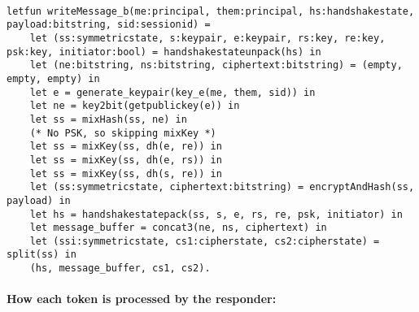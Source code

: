 \begin{lstlisting}

letfun writeMessage_b(me:principal, them:principal, hs:handshakestate, payload:bitstring, sid:sessionid) =
	let (ss:symmetricstate, s:keypair, e:keypair, rs:key, re:key, psk:key, initiator:bool) = handshakestateunpack(hs) in
	let (ne:bitstring, ns:bitstring, ciphertext:bitstring) = (empty, empty, empty) in
	let e = generate_keypair(key_e(me, them, sid)) in
	let ne = key2bit(getpublickey(e)) in
	let ss = mixHash(ss, ne) in
	(* No PSK, so skipping mixKey *)
	let ss = mixKey(ss, dh(e, re)) in
	let ss = mixKey(ss, dh(e, rs)) in
	let ss = mixKey(ss, dh(s, re)) in
	let (ss:symmetricstate, ciphertext:bitstring) = encryptAndHash(ss, payload) in
	let hs = handshakestatepack(ss, s, e, rs, re, psk, initiator) in
	let message_buffer = concat3(ne, ns, ciphertext) in
	let (ssi:symmetricstate, cs1:cipherstate, cs2:cipherstate) = split(ss) in
	(hs, message_buffer, cs1, cs2).

\end{lstlisting}

\paragraph{How each token is processed by the responder:}$ $

